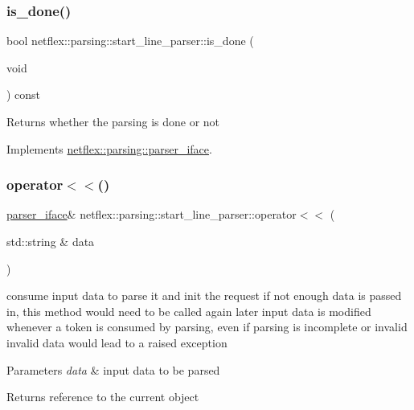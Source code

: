 \subsubsection{\texorpdfstring{is\+\_\+done()}{is\_done()}}
{\footnotesize\ttfamily bool netflex\+::parsing\+::start\+\_\+line\+\_\+parser\+::is\+\_\+done (\begin{DoxyParamCaption}\item[{void}]{ }\end{DoxyParamCaption}) const\hspace{0.3cm}{\ttfamily [virtual]}}

\begin{DoxyReturn}{Returns}
whether the parsing is done or not 
\end{DoxyReturn}


Implements \hyperlink{classnetflex_1_1parsing_1_1parser__iface_afebd1cc50d5958f712dfac0c023fd162}{netflex\+::parsing\+::parser\+\_\+iface}.

\mbox{\label{classnetflex_1_1parsing_1_1start__line__parser_a9a573ace2b0c41171e5dda3c16fa71e8}} 
\subsubsection{\texorpdfstring{operator$<$$<$()}{operator<<()}}
{\footnotesize\ttfamily \hyperlink{classnetflex_1_1parsing_1_1parser__iface}{parser\+\_\+iface}\& netflex\+::parsing\+::start\+\_\+line\+\_\+parser\+::operator$<$$<$ (\begin{DoxyParamCaption}\item[{std\+::string \&}]{data }\end{DoxyParamCaption})\hspace{0.3cm}{\ttfamily [virtual]}}

consume input data to parse it and init the request if not enough data is passed in, this method would need to be called again later input data is modified whenever a token is consumed by parsing, even if parsing is incomplete or invalid invalid data would lead to a raised exception


\begin{DoxyParams}{Parameters}
{\em data} & input data to be parsed \\
\hline
\end{DoxyParams}
\begin{DoxyReturn}{Returns}
reference to the current object 
\end{DoxyReturn}


